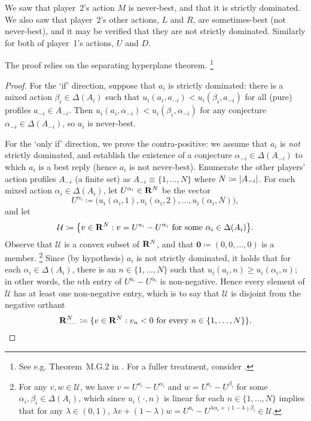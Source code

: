 \addtocounter{example}{-2}
\begin{example}[continued]
	\label{example:rbty_neverbest_pearce}
	We saw that player~2's action $M$ is never-best, and that it is strictly dominated. We also saw that player~2's other actions, $L$ and $R$, are sometimes-best (not never-best), and it may be verified that they are not strictly dominated. Similarly for both of player~1's actions, $U$ and $D$.
\end{example}
\addtocounter{example}{1}

The proof relies on the separating hyperplane theorem.%
	\footnote{See e.g. Theorem~M.G.2 in \textcite[][p.~948]{MascolellWhinstonGreen1995}. For a fuller treatment, consider \textcite{Border2016}.}

\begin{proof}
	For the `if' direction, suppose that $a_i$ is strictly dominated: there is a mixed action $\beta_i \in \Delta(A_i)$ such that $u_i(a_i,a_{-i}) < u_i(\beta_i,a_{-i})$ for all (pure) profiles $a_{-i} \in A_{-i}$. Then $u_i(a_i,\alpha_{-i}) < u_i(\beta_i,\alpha_{-i})$ for any conjecture $\alpha_{-i} \in \Delta(A_{-i})$, so $a_i$ is never-best.

	For the `only if' direction, we prove the contra-positive: we assume that $a_i$ is \emph{not} strictly dominated, and establish the existence of a conjecture $\alpha_{-i} \in \Delta(A_{-i})$ to which $a_i$ is a best reply (hence $a_i$ is not never-best). Enumerate the other players' action profiles $A_{-i}$ (a finite set) as $A_{-i} \equiv \{1,\dots,N\}$ where $N \coloneqq \abs*{A_{-i}}$. For each mixed action $\alpha_i \in \Delta(A_i)$, let $U^{\alpha_i} \in \mathbf{R}^N$ be the vector 
	\begin{equation*}
		U^{\alpha_i} \coloneqq \bigl( u_i(\alpha_i,1), u_i(\alpha_i,2), \dots, u_i(\alpha_i,N) \bigr) ,
	\end{equation*}
	and let
	\begin{equation*}
		\mathcal{U} \coloneqq \left\{ v \in \R^N : \text{$v = U^{a_i} - U^{\alpha_i}$ for some $\alpha_i \in \Delta(A_i)$} \right\} .
	\end{equation*}
	Observe that $\mathcal{U}$ is a convex subset of $\mathbf{R}^N$, and that $\boldsymbol{0} \coloneqq (0,0,\dots,0)$ is a member.%
		\footnote{For any $v,w \in \mathcal{U}$, we have $v = U^{a_i} - U^{\alpha_i}$ and $w = U^{a_i} - U^{\beta_i}$ for some $\alpha_i,\beta_i \in \Delta(A_i)$, which since $u_i(\cdot,n)$ is linear for each $n \in \{1,\dots,N\}$ implies that for any $\lambda \in (0,1)$, $\lambda v + (1-\lambda) w = U^{a_i} - U^{\lambda \alpha_i + (1-\lambda) \beta_i} \in \mathcal{U}$.}
	Since (by hypothesis) $a_i$ is not strictly dominated, it holds that for each $\alpha_i \in \Delta(A_i)$, there is an $n \in \{1,\dots,N\}$ such that $u_i(a_i,n) \geq u_i(\alpha_i,n)$; in other words, the $n$th entry of $U^{a_i}-U^{\alpha_i}$ is non-negative. Hence every element of $\mathcal{U}$ has at least one non-negative entry, which is to say that $\mathcal{U}$ is disjoint from the negative orthant
	\begin{equation*}
		\mathbf{R}_{--}^N \coloneqq \{ v \in \mathbf{R}^N : \text{$v_n < 0$ for every $n \in \{1,\dots,N\}$} \} .
	\end{equation*}


\end{proof}
